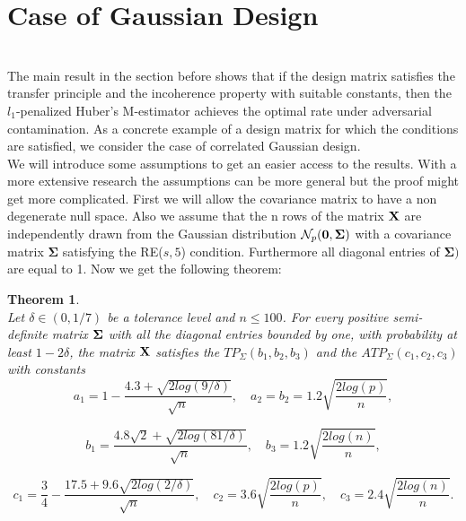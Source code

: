 \documentclass[a4paper,10pt]{article}
\newtheorem{theorem}{Theorem}
\theoremstyle{definition}
\begin{document}
	
\section{Case of Gaussian Design}\ \\	
	
	The main result in the section before shows that if the design matrix satisfies the transfer principle and the incoherence property with suitable constants, then the $l_1$-penalized Huber's M-estimator achieves the optimal rate under adversarial contamination. As a concrete example of a design matrix for which the conditions are satisfied, we consider the case of correlated Gaussian design.\\
	We will introduce some assumptions to get an easier access to the results. With a more extensive research the assumptions can be more general but the proof might get more complicated.
	First we will allow the covariance matrix to have a non degenerate null space. Also we assume that the n rows of the matrix $\bold{X}$ are independently drawn from the Gaussian distribution $\mathcal{N}_p(\bold{0},\boldsymbol{\Sigma})$ with a covariance matrix $\boldsymbol{\Sigma}$ satisfying the RE($s,5$) condition. Furthermore all diagonal entries of $\boldsymbol{\Sigma})$ are equal to 1. Now we get the following theorem:
	
	
	\begin{theorem}\ \\
		Let $\delta \in (0, 1/7)$ be a tolerance level and $n \leq 100$. For every positive semi-definite matrix $\bold{\Sigma}$ with all the diagonal entries bounded by one, with probability at least $1-2\delta$, the matrix $\bold{X}$ satisfies the $TP_{\Sigma}(b_1,b_2,b_3)$ and the $ATP_{\Sigma}(c_1,c_2,c_3)$ with constants
		\begin{equation}
			a_1 = 1-\frac{4.3+\sqrt{2log(9/\delta)}}{\sqrt{n}}, \quad a_2=b_2=1.2\sqrt{\frac{2log(p)}{n}},
		\end{equation}
		
		\begin{equation}
			b_1 = \frac{4.8\sqrt{2} + \sqrt{2log(81/\delta)}}{\sqrt{n}}, \quad b_3=1.2\sqrt{\frac{2log(n)}{n}},
		\end{equation}
		
		\begin{equation}
			c_1=\frac{3}{4} - \frac{17.5 + 9.6\sqrt{2log(2/\delta)}}{\sqrt{n}}, \quad c_2 = 3.6 \sqrt{\frac{2log(p)}{n}}, \quad c_3=2.4\sqrt{\frac{2log(n)}{n}}.
		\end{equation}
		
	\end{theorem}
\end{document}
